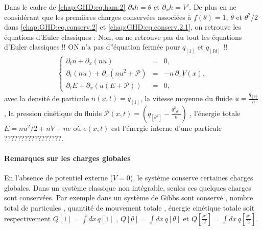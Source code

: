 Dans le cadre de \eqref{chap:GHD:eq.ham.2} \(\partial_\theta h = \theta\) et   \(\partial_x h  = V' \). De plus en ne considérant que les premières charges conservées associées à $f(\theta) = 1$, $\theta$ et $\theta^2/2$ dans \eqref{chap:GHD:eq.conserv.2} et \eqref{chap:GHD:eq.conserv.2.1}, on retrouve les équations d’Euler classiques :
{\color{blue}
  Non, on ne retrouve pas du tout les équations d'Euler classiques !! ON n'a pas d''équation fermée pour $q_{[1]}$ et $q_{[Id]}$ !! }
\begin{eqnarray}\label{chap:3:eq:hydro.1}
	\left\{
	\begin{array}{rcl}
	\partial_t n + \partial_x (n u) &=& 0, \\
	\partial_t (n u) + \partial_x (n u^2 + \mathcal{P}) &=& -n \, \partial_x V(x), \\
	\partial_t E + \partial_x (u(E+\mathcal{P})) &=& 0,
	\end{array}
	\right .  
\end{eqnarray}
avec la densité de particule $n(x, t) = q_{[1]}$, la vitesse moyenne du fluide $u = \frac{q_{[\theta]}}{n}$ , la pression cinétique du fluide $\mathcal{P}(x, t) = \left( q_{[\theta^2]} - \frac{q_{[\theta]}^2}{n} \right)$ , l'énergie totale $E = nu^2/2 + nV + ne$ où $e(x,t)$ est l'énergie interne d'une particule {\color{blue} ?????????????????}.



\paragraph{Remarques sur les charges globales}
En l’absence de potentiel externe ($V = 0$), le système conserve certaines charges globales. Dans un système classique non intégrable, seules ces quelques charges sont conservées. Par exemple dans un système de Gibbs sont conservé , nombre total de particules , quantité de mouvement totale , énergie cinétique totale soit respectivement $Q[1]  =  \int dx \, q[1]$ , $Q[\theta] = \int dx \, q[\theta]$ et $Q\left[\frac{\theta^2}{2}\right] = \int dx \, q\left[\frac{\theta^2}{2}\right] $. 

